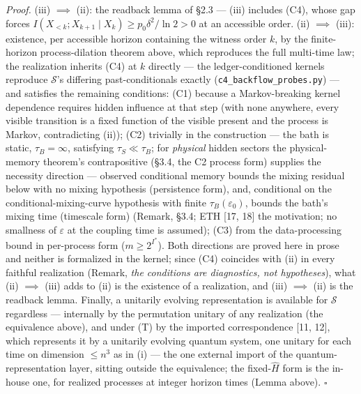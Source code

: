 \documentclass[
]{article}
\begin{document}
\emph{Proof.} (iii) \(\implies\) (ii): the readback lemma of §2.3 ---
(iii) includes (C4), whose gap forces
\(I(X_{<k}; X_{k+1} \mid X_k) \geq p_0\delta^2/\ln 2 > 0\) at an
accessible order. (ii) \(\implies\) (iii): existence, per accessible
horizon containing the witness order \(k\), by the finite-horizon
process-dilation theorem above, which reproduces the full multi-time
law; the realization inherits (C4) at \(k\) directly --- the
ledger-conditioned kernels reproduce \(\mathcal{S}\)'s differing
past-conditionals exactly (\texttt{c4\_backflow\_probes.py}) --- and
satisfies the remaining conditions: (C1) because a Markov-breaking
kernel dependence requires hidden influence at that step (with none
anywhere, every visible transition is a fixed function of the visible
present and the process is Markov, contradicting (ii)); (C2) trivially
in the construction --- the bath is static, \(\tau_B = \infty\),
satisfying \(\tau_S \ll \tau_B\); for \emph{physical} hidden sectors the
physical-memory theorem's contrapositive (§3.4, the C2 process form)
supplies the necessity direction --- observed conditional memory bounds
the mixing residual below with no mixing hypothesis (persistence form),
and, conditional on the conditional-mixing-curve hypothesis with finite
\(\tau_B(\varepsilon_0)\), bounds the bath's mixing time (timescale
form) (Remark, §3.4; ETH {[}17, 18{]} the motivation; no smallness of
\(\varepsilon\) at the coupling time is assumed); (C3) from the
data-processing bound in per-process form (\(m \geq 2^{I^*}\)). Both
directions are proved here in prose and neither is formalized in the
kernel; since (C4) coincides with (ii) in every faithful realization
(Remark, \emph{the conditions are diagnostics, not hypotheses}), what
(ii) \(\implies\) (iii) adds to (ii) is the existence of a realization,
and (iii) \(\implies\) (ii) is the readback lemma. Finally, a unitarily
evolving representation is available for \(\mathcal{S}\) regardless ---
internally by the permutation unitary of any realization (the
equivalence above), and under (T) by the imported correspondence {[}11,
12{]}, which represents it by a unitarily evolving quantum system, one
unitary for each time on dimension \(\leq n^3\) as in (i) --- the one
external import of the quantum-representation layer, sitting outside the
equivalence; the fixed-\(\hat{H}\) form is the in-house one, for
realized processes at integer horizon times (Lemma above). \(\square\)
\end{document}
